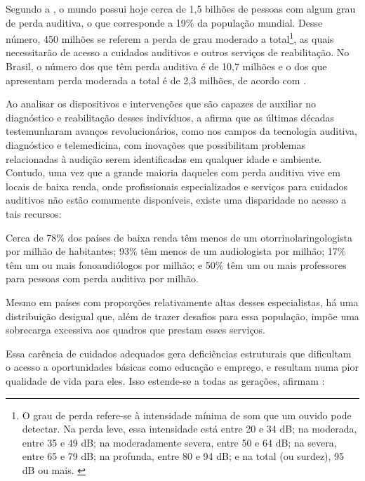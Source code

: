 Segundo a , o mundo possui hoje cerca de 1,5 bilhões de pessoas com algum grau de perda auditiva, o que corresponde a 19\% da população mundial.
Desse número, 450 milhões se referem a perda de grau moderado a total\footnote{
    O grau de perda refere-se à intensidade mínima de som que um ouvido pode detectar.
    Na perda leve, essa intensidade está entre 20 e 34 dB; na moderada, entre 35 e 49 dB; na moderadamente severa, entre 50 e 64 dB; na severa, entre 65 e 79 dB; na profunda, entre 80 e 94 dB; e na total (ou surdez), 95 dB ou mais.
    \cite[p. 38]{who-2021-report-hearing}
}, as quais necessitarão de acesso a cuidados auditivos e outros serviços de reabilitação.
No Brasil, o número dos que têm perda auditiva é de 10,7 milhões e o dos que apresentam perda moderada a total é de 2,3 milhões, de acordo com .


Ao analisar os dispositivos e intervenções que são capazes de auxiliar no diagnóstico e reabilitação desses indivíduos, a  afirma que as últimas décadas testemunharam avanços revolucionários, como nos campos da tecnologia auditiva, diagnóstico e telemedicina, com inovações que possibilitam problemas relacionadas à audição serem identificadas em qualquer idade e ambiente.
Contudo, uma vez que a grande maioria daqueles com perda auditiva vive em locais de baixa renda, onde profissionais especializados e serviços para cuidados auditivos não estão comumente disponíveis, existe uma disparidade no acesso a tais recursos:

\begin{citacao}
    Cerca de 78\% dos países de baixa renda têm menos de um otorrinolaringologista por milhão de habitantes; 93\% têm menos de um audiologista por milhão; 17\% têm um ou mais fonoaudiólogos por milhão; e 50\% têm um ou mais professores para pessoas com perda auditiva por milhão.

    Mesmo em países com proporções relativamente altas desses especialistas, há uma distribuição desigual que, além de trazer desafios para essa população, impõe uma sobrecarga excessiva aos quadros que prestam esses serviços.~\cite{opas-2021-oms-estima}
\end{citacao}

Essa carência de cuidados adequados gera deficiências estruturais que dificultam o acesso a oportunidades básicas como educação e emprego, e resultam numa pior qualidade de vida para eles.
Isso estende-se a todas as gerações, afirmam :

